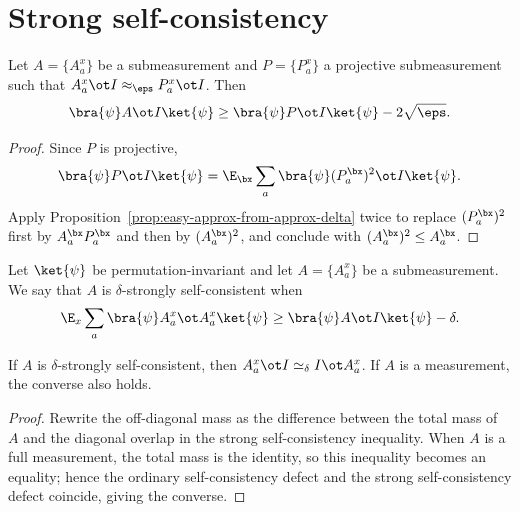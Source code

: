 \section{Strong self-consistency}

\begin{lemma}\label{prop:completeness-transfer-projective-P}
	\leanok
	Let $A=\{A_a^x\}$ be a submeasurement and $P=\{P_a^x\}$ a projective submeasurement such that $A_a^x \ot I \approx_\eps P_a^x \ot I$. Then
	\[
		\bra{\psi} A \ot I \ket{\psi} \ge \bra{\psi} P \ot I \ket{\psi} - 2\sqrt\eps.
	\]
\end{lemma}
\begin{proof}
	\leanok
	Since $P$ is projective,
	\[
		\bra{\psi} P \ot I \ket{\psi}
		= \E_{\bx} \sum_a \bra{\psi} (P^{\bx}_a)^2 \ot I \ket{\psi}.
	\]
	Apply Proposition~\ref{prop:easy-approx-from-approx-delta} twice to replace $(P^\bx_a)^2$ first by $A^\bx_aP^\bx_a$ and then by $(A^\bx_a)^2$, and conclude with $(A_a^\bx)^2 \le A_a^\bx$.
\end{proof}

\begin{definition}\label{def:strong-self-consistency}
	\leanok
	Let $\ket{\psi}$ be permutation-invariant and let $A=\{A_a^x\}$ be a submeasurement. We say that $A$ is $\delta$-strongly self-consistent when
	\[
		\E_x \sum_a \bra{\psi} A_a^x \ot A_a^x \ket{\psi}
		\ge
		\bra{\psi} A \ot I \ket{\psi} - \delta.
	\]
\end{definition}

\begin{lemma}\label{prop:other-two-notions-of-self-consistency}
	\leanok
	If $A$ is $\delta$-strongly self-consistent, then $A_a^x \ot I \simeq_\delta I \ot A_a^x$. If $A$ is a measurement, the converse also holds.
\end{lemma}
\begin{proof}
	\leanok
	Rewrite the off-diagonal mass as the difference between the total mass of $A$ and the diagonal overlap in the strong self-consistency inequality.
	When $A$ is a full measurement, the total mass is the identity, so this inequality becomes an equality; hence the ordinary self-consistency defect and the strong self-consistency defect coincide, giving the converse.
\end{proof}

